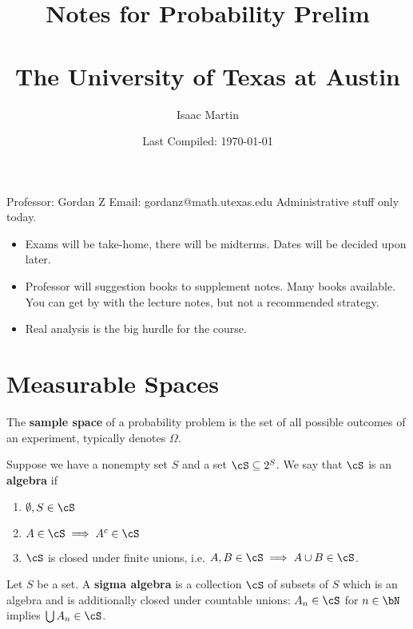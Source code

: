 
\usepackage{indentfirst}

\title{Notes for Probability Prelim \\ \vspace{0.5em}{\Large Fall 2022}\vspace{0.5em}\\ The University of Texas at Austin}
\date{Last Compiled: \today}
\author{Isaac Martin}


\pagestyle{empty}
\maketitle
\newpage
\tableofcontents
\newpage
{} 
Professor: Gordan Z
Email: gordanz@math.utexas.edu
Administrative stuff only today.
\begin{itemize}
  \item Exams will be take-home, there will be midterms. Dates will be decided upon later.
  \item Professor will suggestion books to supplement notes. Many books available. You can get by with the lecture notes, but not a recommended strategy.
  \item Real analysis is the big hurdle for the course.
\end{itemize}

\bigskip

\section{Measurable Spaces}
The \textbf{sample space} of a probability problem is the set of all possible outcomes of an experiment, typically denotes $\Omega$.

\begin{defn}\label{defn:algebra}
  Suppose we have a nonempty set $S$ and a set $\cS \subseteq 2^S$. We say that $\cS$ is an \textbf{algebra} if
  \begin{enumerate}[(1)]
    \item $\emptyset, S \in \cS$
    \item $A \in \cS\implies A^c \in \cS$
    \item $\cS$ is closed under finite unions, i.e. $A,B \in \cS\implies A\cup B \in \cS$.
  \end{enumerate}
\end{defn}

\begin{defn}\label{defn:sigma-algebra}
  Let $S$ be a set. A \textbf{sigma algebra} is a collection $\cS$ of subsets of $S$ which is an algebra and is additionally closed under countable unions: $A_n \in \cS$ for $n \in \bN$ implies $\bigcup A_n \in \cS$.
\end{defn}

